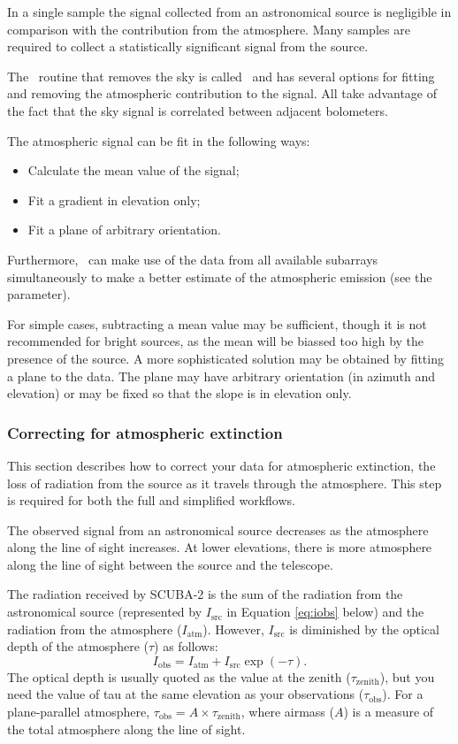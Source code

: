 \documentclass[oneside,11pt]{starlink}
\begin{document}
In a single sample the signal collected from an astronomical source is
negligible in comparison with the contribution from the
atmosphere. Many samples are required to collect a statistically
significant signal from the source.

The \SMURF\ routine that removes the sky is called \remsky\ and has
several options for fitting and removing the atmospheric contribution
to the signal. All take advantage of the fact that the sky signal is
correlated between adjacent bolometers.

The atmospheric signal can be fit in the following ways:
\begin{itemize}
\item Calculate the mean value of the signal;
\item Fit a gradient in elevation only;
\item Fit a plane of arbitrary orientation.
\end{itemize}
Furthermore, \remsky\ can make use of the data from all available
subarrays simultaneously to make a better estimate of the atmospheric
emission (see the  parameter).

For simple cases, subtracting a mean value may be sufficient, though
it is not recommended for bright sources, as the mean will be biassed
too high by the presence of the source. A more sophisticated solution
may be obtained by fitting a plane to the data. The plane may have
arbitrary orientation (in azimuth and elevation) or may be fixed so
that the slope is in elevation only.

\subsubsection{Correcting for atmospheric extinction\label{se:extinction}}

This section describes how to correct your data for atmospheric
extinction, the loss of radiation from the source as it travels
through the atmosphere. This step is required for both the full and
simplified workflows.

The observed signal from an astronomical source decreases as the
atmosphere along the line of sight increases. At lower elevations,
there is more atmosphere along the line of sight between the source
and the telescope.

The radiation received by SCUBA-2 is the sum of the radiation from the
astronomical source (represented by $I_{\textrm{src}}$ in Equation
\ref{eq:iobs} below) and the radiation from the atmosphere ($I_{\textrm{atm}}$). However, $I_{\textrm{src}}$ is diminished by the optical depth
of the atmosphere ($\tau$) as follows:
\begin{equation}
I_{\textrm{obs}} = I_{\textrm{atm}} + I_{\textrm{src}} \exp(-\tau).
\label{eq:iobs}
\end{equation}
The optical depth is usually quoted as the value at the zenith
($\tau_{\textrm{zenith}}$), but you need the value of tau at the same
elevation as your observations ($\tau_{\textrm{obs}}$). For a
plane-parallel atmosphere, $\tau_{\textrm{obs}} = A \times \tau_{\textrm{zenith}}$, where airmass ($A$) is a measure of the total atmosphere
along the line of sight.
\end{document}
